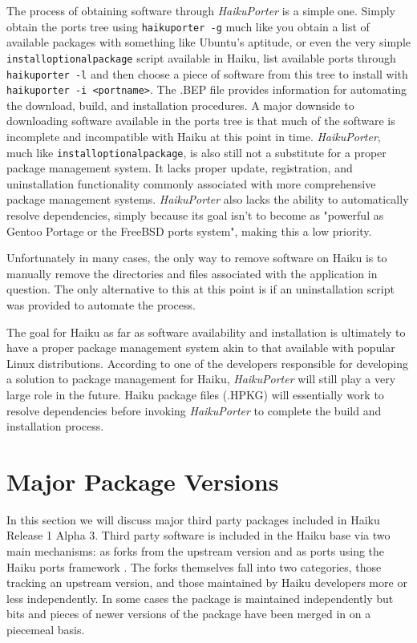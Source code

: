 \documentclass{article}
\begin{document}
The process of obtaining software through \textit{HaikuPorter} is a
simple one. Simply obtain the ports tree using \texttt{haikuporter -g}
much like you obtain a list of available packages with something like
Ubuntu's aptitude, or even the very
simple \texttt{installoptionalpackage} script available in Haiku, list
available ports through \texttt{haikuporter -l} and then choose a
piece of software from this tree to install with \texttt{haikuporter
-i <portname>}. The .BEP file provides information for automating the
download, build, and installation procedures.\cite{BepFiles} A major
downside to downloading software available in the ports tree is that
much of the software is incomplete and incompatible with Haiku at this
point in time. \textit{HaikuPorter}, much
like \texttt{installoptionalpackage}, is also still not a substitute
for a proper package management system. It lacks proper update,
registration, and uninstallation functionality commonly associated
with more comprehensive package management
systems. \textit{HaikuPorter} also lacks the ability to automatically
resolve dependencies, simply because its goal isn't to become as
"powerful as Gentoo Portage or the FreeBSD ports system", making this
a low priority.\cite{HaikuPorter}

Unfortunately in many cases, the only way to remove software on Haiku
is to manually remove the directories and files associated with the
application in question. The only alternative to this at this point is
if an uninstallation script was provided to automate the
process.\cite{AppInstallUninstall}

The goal for Haiku as far as software availability and installation is
ultimately to have a proper package management system akin to that
available with popular Linux distributions.\cite{HaikuFuturePkgMan}
According to one of the developers responsible for developing a
solution to package management for Haiku, \textit{HaikuPorter} will
still play a very large role in the future. Haiku package files
(.HPKG) will essentially work to resolve dependencies before
invoking \textit{HaikuPorter} to complete the build and installation
process.\cite{TappeOnPackages}

\section{Major Package Versions}

In this section we will discuss major third party packages included in
Haiku Release 1 Alpha 3.  Third party software is included in the
Haiku base via two main mechanisms: as forks from the upstream version
and as ports using the Haiku ports framework \cite{HaikuR1A3Src}.  The
forks themselves fall into two categories, those tracking an upstream
version, and those maintained by Haiku developers more or less
independently.  In some cases the package is maintained independently
but bits and pieces of newer versions of the package have been merged
in on a piecemeal basis.
\end{document}
